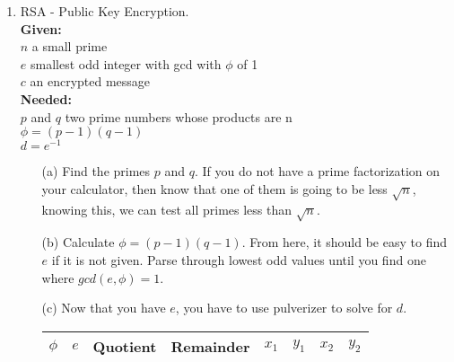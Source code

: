 \documentclass[12pt]{amsart}
\begin{document}
\begin{enumerate}
\item RSA - Public Key Encryption. \\
{\bf Given: }\\ $n$ a small prime\\ $e$ smallest odd integer with gcd with $\phi$ of 1\\ $c$ an encrypted message\\
{\bf Needed: }\\ $p$ and $q$ two prime numbers whose products are n\\ $\phi = (p-1)(q-1)$\\
$d = e^{-1}$\\
\begin{itemize}
\item[(a)] Find the primes $p$ and $q$.  If you do not have a prime factorization on your calculator, then know that one of them is going to be less $\sqrt{n}$, knowing this, we can test all primes less than $\sqrt{n}$.\\
\item[(b)] Calculate $\phi = (p-1)(q-1)$.  From here, it should be easy to find $e$ if it is not given.  Parse through lowest odd values until you find one where $gcd(e, \phi) = 1$.\\
\item[(c)] Now that you have $e$, you have to use pulverizer to solve for $d$. 

\begin{center}
\begin{tabular}{ |cccc|cccc| } 
 \hline
 $\phi$ & $e$ & Quotient & Remainder & $x_1$ & $y_1$ & $x_2$ & $y_2$ \\ 
 \hline
\end{tabular}
\end{center}

\end{itemize}

\end{enumerate}
\end{document}
